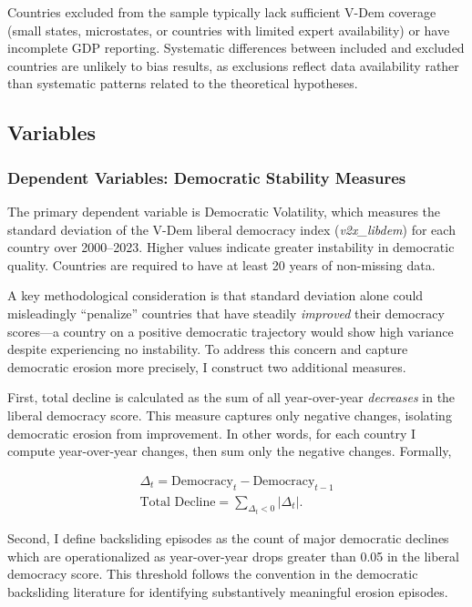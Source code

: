 \documentclass[
  letterpaper,
  DIV=11,
  numbers=noendperiod]{scrartcl}
\begin{document}
Countries excluded from the sample typically lack sufficient V-Dem
coverage (small states, microstates, or countries with limited expert
availability) or have incomplete GDP reporting. Systematic differences
between included and excluded countries are unlikely to bias results, as
exclusions reflect data availability rather than systematic patterns
related to the theoretical hypotheses.

\subsection{Variables}\label{variables}

\subsubsection{Dependent Variables: Democratic Stability
Measures}\label{dependent-variables-democratic-stability-measures}

The primary dependent variable is Democratic Volatility, which measures
the standard deviation of the V-Dem liberal democracy index
(\emph{v2x\_libdem}) for each country over 2000--2023. Higher values
indicate greater instability in democratic quality. Countries are
required to have at least 20 years of non-missing data.

A key methodological consideration is that standard deviation alone
could misleadingly ``penalize'' countries that have steadily
\emph{improved} their democracy scores---a country on a positive
democratic trajectory would show high variance despite experiencing no
instability. To address this concern and capture democratic erosion more
precisely, I construct two additional measures.

First, total decline is calculated as the sum of all year-over-year
\emph{decreases} in the liberal democracy score. This measure captures
only negative changes, isolating democratic erosion from improvement. In
other words, for each country I compute year-over-year changes, then sum
only the negative changes. Formally,

\[
\begin{gathered}
\Delta_t = \text{Democracy}_t - \text{Democracy}_{t-1} \\
\text{Total Decline} = \sum_{\Delta_t <0} |\Delta_t|.
\end{gathered}
\]

Second, I define backsliding episodes as the count of major democratic
declines which are operationalized as year-over-year drops greater than
0.05 in the liberal democracy score. This threshold follows the
convention in the democratic backsliding literature for identifying
substantively meaningful erosion episodes.
\end{document}
